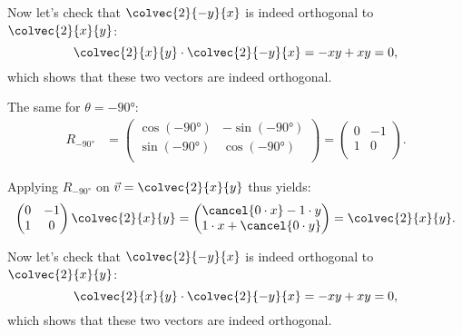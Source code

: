 {\begin{enumerate}
\begin{enumerate}
{\begin{answer}
													Now let's check that $\colvec{2}{-y}{x}$ is indeed orthogonal to $\colvec{2}{x}{y}$:
													\begin{equation*}
														\colvec{2}{x}{y} \cdot \colvec{2}{-y}{x} = -xy+xy = 0,
													\end{equation*}
													which shows that these two vectors are indeed orthogonal.

													The same for $\theta=-\ang{90}$:
													\begin{align*}  
														R_{-\ang{90}}&=
														\begin{pmatrix}
															\cos\left( -\ang{90} \right) & -\sin\left( -\ang{90} \right) \\
															\sin\left( -\ang{90} \right) &  \cos\left( -\ang{90} \right) \\
														\end{pmatrix}
														= \begin{pmatrix}
															0 & -1 \\
															1 & 0  \\
														\end{pmatrix}.
													\end{align*}

													Applying $R_{-\ang{90}}$ on $\vec{v}=\colvec{2}{x}{y}$ thus yields:
													\begin{align*}
														\begin{pmatrix}
															0 & -1 \\
															1 & 0  \\
														\end{pmatrix}\colvec{2}{x}{y}=
														\begin{pmatrix}
															\cancel{0\cdot x}-1\cdot y \\
															1\cdot x + \cancel{0\cdot y} \\
														\end{pmatrix}=\colvec{2}{x}{y}.
													\end{align*}

													Now let's check that $\colvec{2}{-y}{x}$ is indeed orthogonal to $\colvec{2}{x}{y}$:
													\begin{equation*}
														\colvec{2}{x}{y} \cdot \colvec{2}{-y}{x} = -xy+xy = 0,
													\end{equation*}
													which shows that these two vectors are indeed orthogonal.
												\end{answer}
											}\fi


\end{enumerate}
\end{enumerate}}

